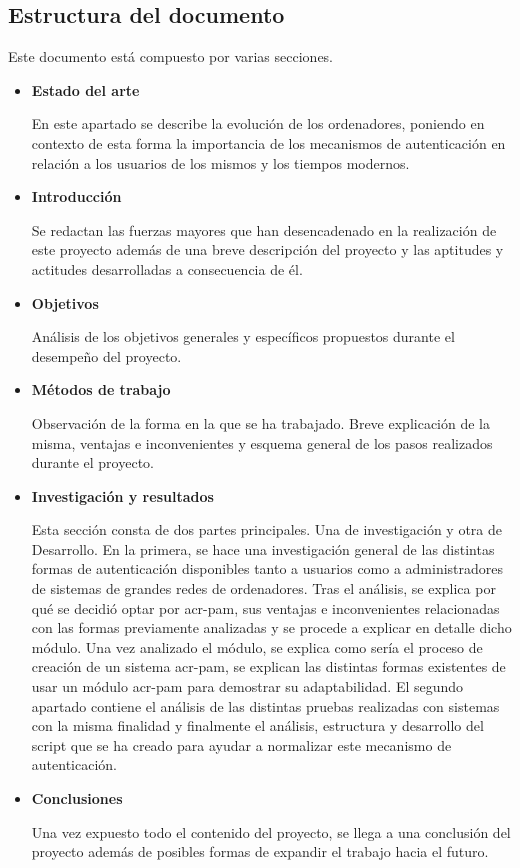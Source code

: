 \documentclass[twoside, titlepage, 12pt, a4paper]{article}
\begin{document}
\subsection{Estructura del documento}
Este documento está compuesto por varias secciones.
\begin{itemize}
	\item{\textbf{Estado del arte}}\par
		En este apartado se describe la evolución de los ordenadores, poniendo en contexto de esta forma la importancia de los mecanismos de autenticación en relación a los usuarios de los mismos y los tiempos modernos.
	\item{\textbf{Introducción}}\par
		Se redactan las fuerzas mayores que han desencadenado en la realización de este proyecto además de una breve descripción del proyecto y las aptitudes y actitudes desarrolladas a consecuencia de él.
	\item{\textbf{Objetivos}}\par
		Análisis de los objetivos generales y específicos propuestos durante el desempeño del proyecto.
	\item{\textbf{Métodos de trabajo}}\par
		Observación de la forma en la que se ha trabajado. Breve explicación de la misma, ventajas e inconvenientes y esquema general de los pasos realizados durante el proyecto.
	\item{\textbf{Investigación y resultados}}\par
		Esta sección consta de dos partes principales. Una de investigación y otra de Desarrollo. En la primera, se hace una investigación general de las distintas formas de autenticación disponibles tanto a usuarios como a administradores de sistemas de grandes redes de ordenadores. Tras el análisis, se explica por qué se decidió optar por \gls{acr-pam}, sus ventajas e inconvenientes relacionadas con las formas previamente analizadas y se procede a explicar en detalle dicho módulo. Una vez analizado el módulo, se explica como sería el proceso de creación de un sistema \gls{acr-pam}, se explican las distintas formas existentes de usar un módulo \gls{acr-pam} para demostrar su adaptabilidad. El segundo apartado contiene el análisis de las distintas pruebas realizadas con sistemas con la misma finalidad y finalmente el análisis, estructura y desarrollo del \gls{script} que se ha creado para ayudar a normalizar este mecanismo de autenticación.
	\item{\textbf{Conclusiones}}\par
		Una vez expuesto todo el contenido del proyecto, se llega a una conclusión del proyecto además de posibles formas de expandir el trabajo hacia el futuro.
\end{itemize}
\clearpage
\end{document}
